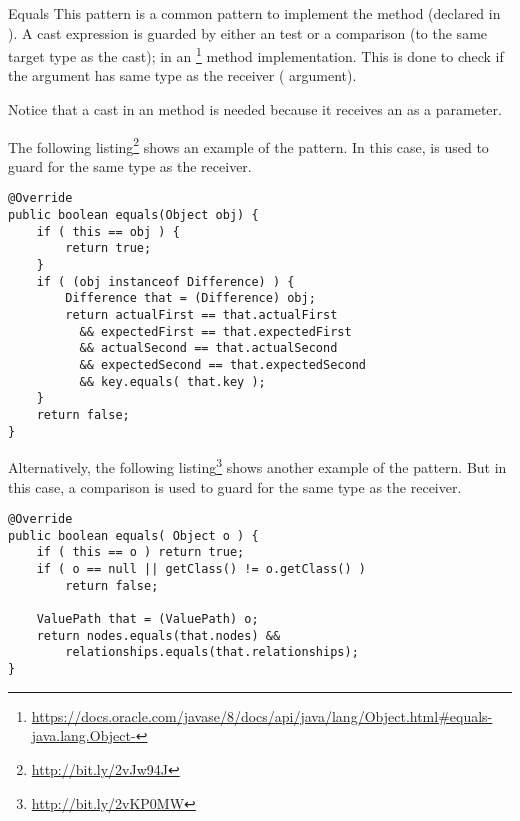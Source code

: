 \begin{pattern}{Equals}
This pattern is a common pattern to implement the  method (declared in ).
A cast expression is guarded by either an  test or a  comparison (to the same target type as the cast);
in an \footnote{\url{https://docs.oracle.com/javase/8/docs/api/java/lang/Object.html\#equals-java.lang.Object-}} method implementation.
This is done to check if the argument has same type as the receiver
( argument).

Notice that a cast in an  method is needed because it
receives an  as a parameter.

\instances{}
The following listing\footnote{\url{http://bit.ly/2vJw94J}}
shows an example of the \pname{} pattern.
In this case,  is used to guard for
the same type as the receiver.

\begin{verbatim}
@Override
public boolean equals(Object obj) {
    if ( this == obj ) {
        return true;
    }
    if ( (obj instanceof Difference) ) {
        Difference that = (Difference) obj;
        return actualFirst == that.actualFirst
          && expectedFirst == that.expectedFirst
          && actualSecond == that.actualSecond 
          && expectedSecond == that.expectedSecond
          && key.equals( that.key );
    }
    return false;
}
\end{verbatim}

Alternatively, the following listing\footnote{\url{http://bit.ly/2vKP0MW}} shows another example of the \pname{} pattern.
But in this case, a  comparison is used to guard for the same type as the receiver.

\begin{verbatim}
@Override
public boolean equals( Object o ) {
    if ( this == o ) return true;
    if ( o == null || getClass() != o.getClass() )
        return false;

    ValuePath that = (ValuePath) o;
    return nodes.equals(that.nodes) &&
        relationships.equals(that.relationships);
}
\end{verbatim}


\end{pattern}
